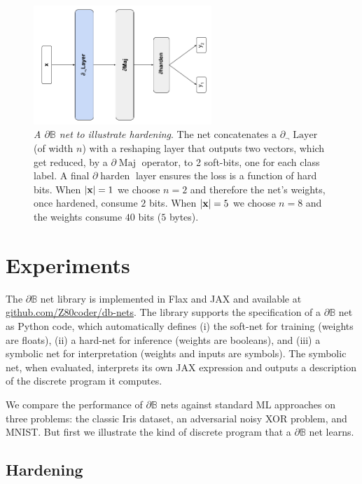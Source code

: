 \documentclass{article} %
\begin{document}
\begin{figure}[t!]
	\centering
	\includegraphics[width=0.6\textwidth]{toy-example-architecture.png}
	\caption{{\em A $\partial\mathbb{B}$ net to illustrate hardening}. The net concatenates a $\partial_{\neg}\!\operatorname{Layer}$ (of width $n$) with a reshaping layer that  outputs two vectors, which get reduced, by a $\partial\!\operatorname{Maj}$ operator,  to 2 soft-bits, one for each class label. A final $\partial\!\operatorname{harden}$ layer ensures the loss is a function of hard bits. When $|{\bf x}|=1$ we choose $n=2$ and therefore the net's weights, once hardened, consume $2$ bits. When $|{\bf x}|=5$ we choose $n=8$ and the weights consume $40$ bits ($5$ bytes).}
	\label{fig:toy-example-architecture}
\end{figure}

\section{Experiments}\label{sec:experiments}

The $\partial\mathbb{B}$ net library is implemented in Flax \citep{flax2020github} and JAX \citep{jax2018github} and available at {\small \url{github.com/Z80coder/db-nets}}. The library supports the specification of a $\partial\mathbb{B}$ net as Python code, which automatically defines (i) the soft-net for training (weights are floats), (ii) a hard-net for inference (weights are booleans), and (iii) a symbolic net for interpretation (weights and inputs are symbols). The symbolic net, when evaluated, interprets its own JAX expression and outputs a description of the discrete program it computes.

We compare the performance of $\partial\mathbb{B}$ nets against standard ML approaches on three problems: the classic Iris dataset, an adversarial noisy XOR problem, and MNIST. But first we illustrate the kind of discrete program that a $\partial\mathbb{B}$ net learns.

\subsection{Hardening}
\end{document}
